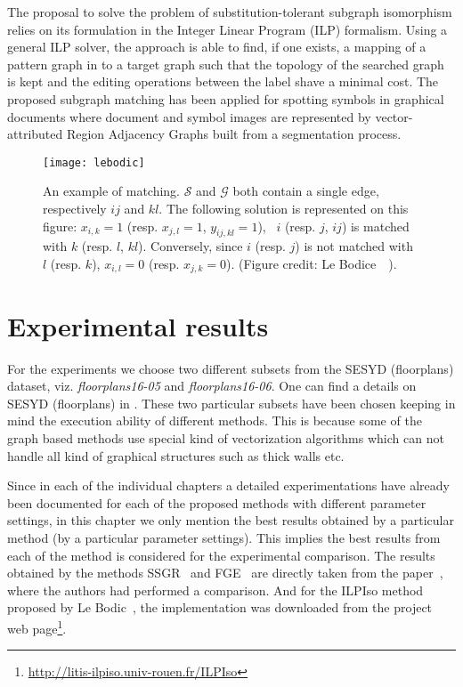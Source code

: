 The proposal to solve the problem of substitution-tolerant subgraph isomorphism relies on its formulation in the Integer Linear Program (ILP) formalism. Using a general ILP solver, the approach is able to find, if one exists, a mapping of a pattern graph in to a target graph such that the topology of the searched graph is kept and the editing operations between the label shave a minimal cost. The proposed subgraph matching has been applied for spotting symbols in graphical documents where document and symbol images are represented by vector-attributed Region Adjacency Graphs built from a segmentation process.
\begin{figure}[h!]
\begin{center}
\texttt{[image: lebodic]}
\caption{An example of matching. $\mathcal{S}$ and $\mathcal{G}$ both contain a single edge, respectively $ij$ and $kl$. The following solution is represented on this figure: $x_{i,k} = 1$ (resp. $x_{j,l} = 1$, $y_{ij,kl} = 1$), \ie~$i$ (resp. $j$, $ij$) is matched with $k$ (resp. $l$, $kl$). Conversely, since $i$ (resp. $j$) is not matched with $l$ (resp. $k$), $x_{i,l} = 0$ (resp. $x_{j,k} = 0$). (Figure credit: Le Bodice~\etal~\cite{LeBodic2012}).}
\end{center}
\label{fig:experiments:ilpiso}
\end{figure}

\section{Experimental results}
\label{sec:experiments:res}
For the experiments we choose two different subsets from the SESYD (floorplans) dataset, viz. \emph{floorplans16-05} and \emph{floorplans16-06}. One can find a details on SESYD (floorplans) in . These two particular subsets have been chosen keeping in mind the execution ability of different methods. This is because some of the graph based methods use special kind of vectorization algorithms which can not handle all kind of graphical structures such as thick walls etc.

Since in each of the individual chapters a detailed experimentations have already been documented for each of the proposed methods with different parameter settings, in this chapter we only mention the best results obtained by a particular method (by a particular parameter settings). This implies the best results from each of the method is considered for the experimental comparison. The results obtained by the methods SSGR~\cite{Qureshi2007} and FGE~\cite{Luqman2011} are directly taken from the paper~\cite{Luqman2011}, where the authors had performed a comparison. And for the ILPIso method proposed by Le Bodic~\etal, the implementation was downloaded from the project web page\footnote{\url{http://litis-ilpiso.univ-rouen.fr/ILPIso}}.

